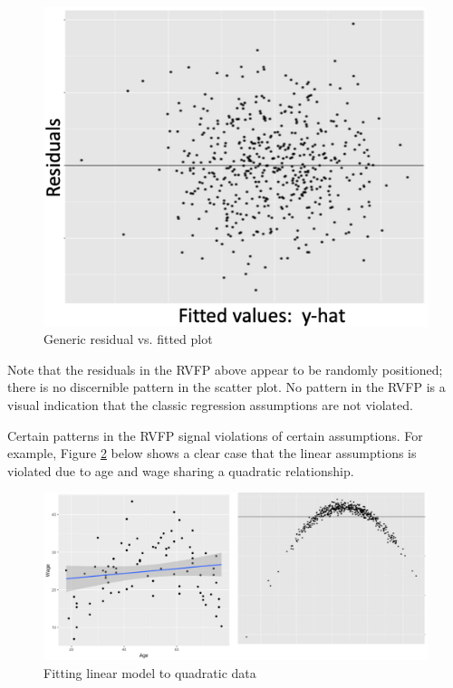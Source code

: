 \documentclass[
]{book}
\begin{document}
\begin{figure}

{\centering \includegraphics[width=\textwidth]{images/genericrvfp} 

}

\caption{Generic residual vs. fitted plot}\label{fig:genericrvfp}
\end{figure}

Note that the residuals in the RVFP above appear to be randomly positioned; there is no discernible pattern in the scatter plot. No pattern in the RVFP is a visual indication that the classic regression assumptions are not violated.

Certain patterns in the RVFP signal violations of certain assumptions. For example, Figure \ref{fig:rvfplinear} below shows a clear case that the linear assumptions is violated due to age and wage sharing a quadratic relationship.

\begin{figure}

{\centering \includegraphics[width=\textwidth]{images/rvfp_linear} 

}

\caption{Fitting linear model to quadratic data}\label{fig:rvfplinear}
\end{figure}
\end{document}

